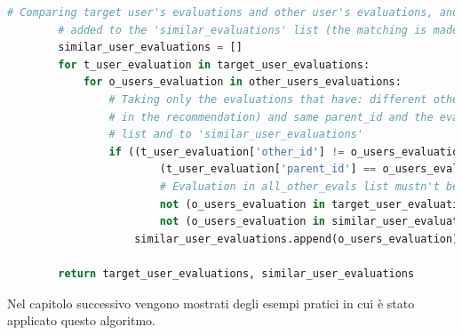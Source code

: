 \begin{itemize}
    \begin{lstlisting}[language=Python, label=lst:UB_CF_4]
        # Comparing target user's evaluations and other user's evaluations, and if there is a match the evaluation is
        # added to the 'similar_evaluations' list (the matching is made comparing the 'parent_id')
        similar_user_evaluations = []
        for t_user_evaluation in target_user_evaluations:
            for o_users_evaluation in other_users_evaluations:
                # Taking only the evaluations that have: different other_id (excluding the target evaluation
                # in the recommendation) and same parent_id and the evaluations that weren't added to 'target_user_evaluations'
                # list and to 'similar_user_evaluations'
                if ((t_user_evaluation['other_id'] != o_users_evaluation['other_id']) and  # Evaluations must have different 'other_id'
                        (t_user_evaluation['parent_id'] == o_users_evaluation['parent_id']) and  # Evaluations must have the same 'parent_id'
                        # Evaluation in all_other_evals list mustn't be already added to \
                        not (o_users_evaluation in target_user_evaluations) and  # the 'target_user_evaluations' list or
                        not (o_users_evaluation in similar_user_evaluations)):  # the 'similar_user_evaluations' list
                    similar_user_evaluations.append(o_users_evaluation)
        
        return target_user_evaluations, similar_user_evaluations
    \end{lstlisting}
\end{itemize}
%
Nel capitolo successivo vengono mostrati degli esempi pratici in cui è stato applicato questo algoritmo.
%
\newpage
%
